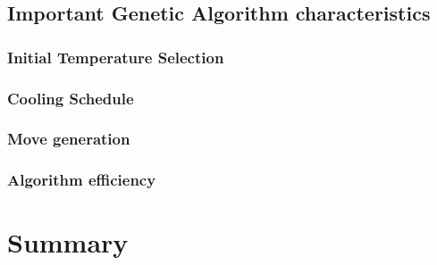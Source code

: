 \subsection{Important Genetic Algorithm characteristics}
\subsubsection{Initial Temperature Selection}
\subsubsection{Cooling Schedule}
\subsubsection{Move generation}
\subsubsection{Algorithm efficiency}

\section {Summary}
